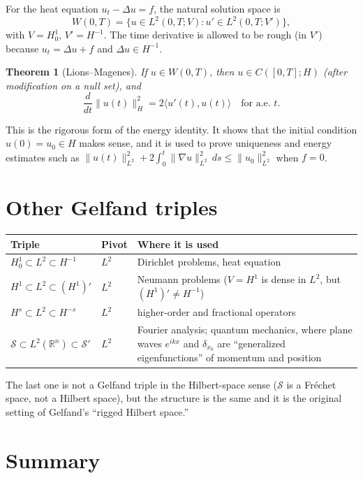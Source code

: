 \documentclass[11pt]{article}
\newcommand{\R}{\mathbb{R}}
\newcommand{\Sch}{\mathcal{S}}
\newcommand{\pair}[2]{\langle #1, #2 \rangle}
\newcommand{\lap}{\Delta}
\newcommand{\grad}{\nabla}
\theoremstyle{definition}
\theoremstyle{plain}
\newtheorem*{theorem}{Theorem}
\begin{document}
For the heat equation $u_t-\lap u=f$, the natural solution space is
\[
  W(0,T)=\{u\in L^2(0,T;V) : u'\in L^2(0,T;V')\},
\]
with $V=H^1_0$, $V'=H^{-1}$. The time derivative is allowed to be rough (in
$V'$) because $u_t=\lap u+f$ and $\lap u\in H^{-1}$.

\begin{theorem}[Lions--Magenes]
If $u\in W(0,T)$, then $u\in C([0,T];H)$ (after modification on a null set),
and
\[
  \frac{d}{dt}\|u(t)\|_H^2 = 2\pair{u'(t)}{u(t)} \quad\text{for a.e. } t.
\]
\end{theorem}

This is the rigorous form of the energy identity. It shows that the initial
condition $u(0)=u_0\in H$ makes sense, and it is used to prove uniqueness and
energy estimates such as
$\|u(t)\|_{L^2}^2+2\int_0^t\|\grad u\|_{L^2}^2\,ds\le\|u_0\|_{L^2}^2$ when
$f=0$.

\section{Other Gelfand triples}
\label{sec:other}

\begin{center}
\renewcommand{\arraystretch}{1.4}
\begin{tabular}{>{\raggedright}p{3.4cm} >{\raggedright}p{2.6cm}
                >{\raggedright\arraybackslash}p{7.6cm}}
  \toprule
  Triple & Pivot & Where it is used \\
  \midrule
  $H^1_0\subset L^2\subset H^{-1}$ & $L^2$
    & Dirichlet problems, heat equation \\
  $H^1\subset L^2\subset (H^1)'$ & $L^2$
    & Neumann problems ($V=H^1$ is dense in $L^2$, but $(H^1)'\ne H^{-1}$) \\
  $H^s\subset L^2\subset H^{-s}$ & $L^2$
    & higher-order and fractional operators \\
  $\Sch\subset L^2(\R^n)\subset\Sch'$ & $L^2$
    & Fourier analysis; quantum mechanics, where plane waves $e^{ikx}$ and
      $\delta_{x_0}$ are ``generalized eigenfunctions'' of momentum and
      position \\
  \bottomrule
\end{tabular}
\end{center}
The last one is not a Gelfand triple in the Hilbert-space sense ($\Sch$ is a
Fr\'echet space, not a Hilbert space), but the structure is the same and it is
the original setting of Gelfand's ``rigged Hilbert space.''

\section{Summary}
\end{document}
